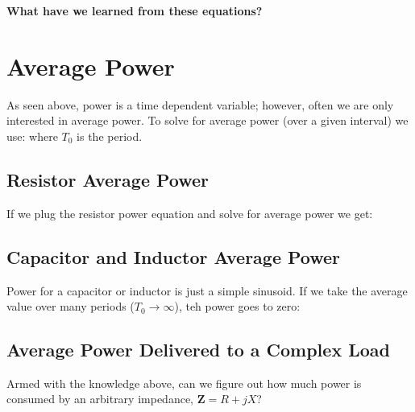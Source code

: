 \documentclass{handout}
\begin{document}
\textbf{What have we learned from these equations?}

\newpage
\clearpage
\pagebreak

\section{Average Power}
As seen above, power is a time dependent variable; however, often we are only interested in average power.  To solve for average power (over a given interval) we use:
\soln{1in}{
\[
P_{AVE} = \frac{1}{T_0}\int_0^{T_0} p(t) \partial t
\]
}
where $T_0$ is the period.

\subsection{Resistor Average Power}
If we plug the resistor power equation and solve for average power we get:

\subsection{Capacitor and Inductor Average Power}
Power for a capacitor or inductor is just a simple sinusoid.  If we take the average value over many periods ($T_0\rightarrow\infty$), teh power goes to zero:
\soln{1in}{
\[
P_{AVE-C} =0
\]
\[
P_{AVE-L} =0
\]
}

\subsection{Average Power Delivered to a Complex Load}
Armed with the knowledge above, can we figure out how much power is consumed by an arbitrary impedance, $\mathbf{Z} =R +jX$?
\end{document}
